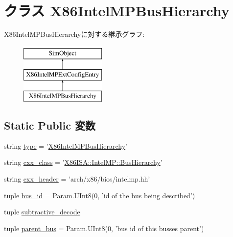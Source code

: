 \hypertarget{classIntelMP_1_1X86IntelMPBusHierarchy}{
\section{クラス X86IntelMPBusHierarchy}
\label{classIntelMP_1_1X86IntelMPBusHierarchy}
}
X86IntelMPBusHierarchyに対する継承グラフ:\begin{figure}[H]
\begin{center}
\leavevmode
\includegraphics[height=3cm]{classIntelMP_1_1X86IntelMPBusHierarchy}
\end{center}
\end{figure}
\subsection*{Static Public 変数}
\begin{DoxyCompactItemize}
\item 
string \hyperlink{classIntelMP_1_1X86IntelMPBusHierarchy_acce15679d830831b0bbe8ebc2a60b2ca}{type} = '\hyperlink{classIntelMP_1_1X86IntelMPBusHierarchy}{X86IntelMPBusHierarchy}'
\item 
string \hyperlink{classIntelMP_1_1X86IntelMPBusHierarchy_a58cd55cd4023648e138237cfc0822ae3}{cxx\_\-class} = '\hyperlink{classX86ISA_1_1IntelMP_1_1BusHierarchy}{X86ISA::IntelMP::BusHierarchy}'
\item 
string \hyperlink{classIntelMP_1_1X86IntelMPBusHierarchy_a17da7064bc5c518791f0c891eff05fda}{cxx\_\-header} = 'arch/x86/bios/intelmp.hh'
\item 
tuple \hyperlink{classIntelMP_1_1X86IntelMPBusHierarchy_a6e34d01145c4deea78b58e36f0a7e81b}{bus\_\-id} = Param.UInt8(0, 'id of the bus being described')
\item 
tuple \hyperlink{classIntelMP_1_1X86IntelMPBusHierarchy_af6e3e63ab843511d098d167740db1f68}{subtractive\_\-decode}
\item 
tuple \hyperlink{classIntelMP_1_1X86IntelMPBusHierarchy_a34c8718cbd13d47b1336836a4ff3b2d0}{parent\_\-bus} = Param.UInt8(0, 'bus id of this busses parent')
\end{DoxyCompactItemize}


